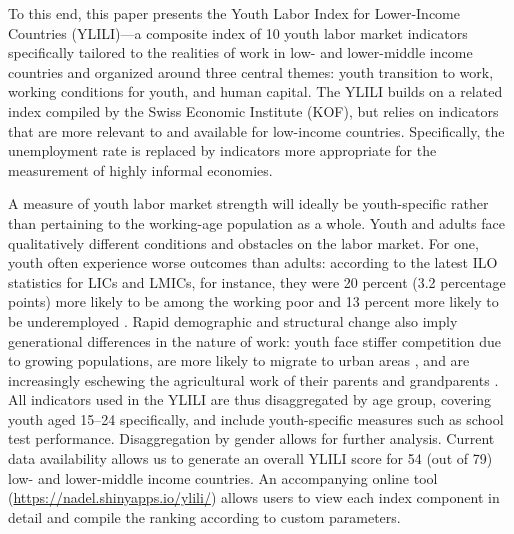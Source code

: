 \documentclass[
  a4paper, twoside, 12pt]{book}
\begin{document}
To this end, this paper presents the Youth Labor Index for Lower-Income Countries (YLILI)---a composite index of 10 youth labor market indicators specifically tailored to the realities of work in low- and lower-middle income countries and organized around three central themes: youth transition to work, working conditions for youth, and human capital. The YLILI builds on a related index compiled by the Swiss Economic Institute (KOF), but relies on indicators that are more relevant to and available for low-income countries. Specifically, the unemployment rate is replaced by indicators more appropriate for the measurement of highly informal economies.

A measure of youth labor market strength will ideally be youth-specific rather than pertaining to the working-age population as a whole. Youth and adults face qualitatively different conditions and obstacles on the labor market. For one, youth often experience worse outcomes than adults: according to the latest ILO statistics for LICs and LMICs, for instance, they were 20 percent (3.2 percentage points) more likely to be among the working poor and 13 percent more likely to be underemployed \autocite{ilo2020b}. Rapid demographic and structural change also imply generational differences in the nature of work: youth face stiffer competition due to growing populations, are more likely to migrate to urban areas \autocite{debrauw2014}, and are increasingly eschewing the agricultural work of their parents and grandparents \autocite{honorati2016}. All indicators used in the YLILI are thus disaggregated by age group, covering youth aged 15--24 specifically, and include youth-specific measures such as school test performance. Disaggregation by gender allows for further analysis. Current data availability allows us to generate an overall YLILI score for 54 (out of 79) low- and lower-middle income countries. An accompanying online tool (\url{https://nadel.shinyapps.io/ylili/}) allows users to view each index component in detail and compile the ranking according to custom parameters.
\end{document}
